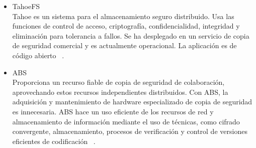 \begin{itemize}
\item TahoeFS\\
Tahoe es un sistema para el almacenamiento seguro distribuido. Usa las funciones de control de acceso, criptografía, confidencialidad, integridad y eliminación para tolerancia a fallos. Se ha desplegado en un servicio de copia de seguridad comercial y es actualmente operacional. La aplicación es de código abierto ~\cite{tahoe}.
\item ABS\\
Proporciona un recurso fiable de copia de seguridad de colaboración, aprovechando estos recursos independientes distribuidos. Con ABS, la adquisición y mantenimiento de hardware especializado de copia de seguridad es innecesaria. ABS hace un uso eficiente de los recursos de red y almacenamiento de información mediante el uso de técnicas, como cifrado convergente, almacenamiento, procesos de verificación y control de versiones eficientes de codificación ~\cite{abs}.
\end{itemize}

